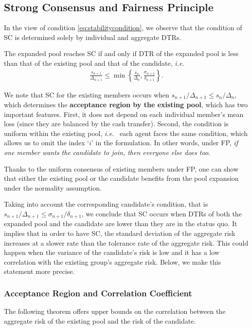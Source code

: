 \documentclass[fleqn,mnsc,nonblindrev]{informs4}
\begin{document}
\subsection{Strong Consensus and Fairness Principle}
In the view of condition \eqref{eq:stabilitycondition}, we observe that the condition of SC is determined solely by individual and aggregate DTRs. 
\begin{theorem}\label{thm:maintheorem}
The expanded pool reaches SC if and only if DTR of the expanded pool is less than that of the existing pool and that of the candidate, {\it i.e.} 
\begin{align}
\frac{s_{n+1}}{\Delta_{n+1}}\le \min\left\{\frac{s_{n}}{\Delta_{n}},  \frac{\sigma_{n+1}}{\delta_{n+1}}\right\}.\label{ineq:maintheoremcondition}    
\end{align}
\end{theorem}
We note that SC for the existing members occurs when  {$s_{n+1}/\Delta_{n+1}\le s_{n}/\Delta_{n},$ which} determines the {\bf acceptance region by the existing pool}, which has two important features. First, it does not depend on each individual member's mean loss (since they are balanced by the cash transfer). Second, the condition is uniform within the existing pool, {\it i.e.}~ each agent faces the same
condition, which allows us to omit the index ‘$i$’ in the formulation. In other words, under FP, \textit{if one member wants the candidate to join, then everyone else does too}. 
\begin{remark}\label{rmk:either}
  {Thanks to the uniform consensus of existing members under FP, one can show that either the existing pool or the candidate benefits from the pool expansion under the normality assumption.}
\end{remark}
Taking into account the corresponding candidate's condition, that is  {$s_{n+1}/\Delta_{n+1}\le \sigma_{n+1}/\delta_{n+1}$,} we conclude that SC occurs when DTRs of both the expanded pool and the candidate are lower than they are in the status quo. It implies that in order to have SC, the standard deviation of the aggregate risk increases at a slower rate than the tolerance rate of the aggregate risk. This could happen when the variance of the candidate's risk is low and it has a low correlation with the existing group's aggregate risk. Below, we make this statement more precise.  

\subsubsection*{Acceptance Region and Correlation Coefficient}
The following theorem offers upper bounds on the correlation between the aggregate risk of the existing pool and the risk of the candidate.
\end{document}
